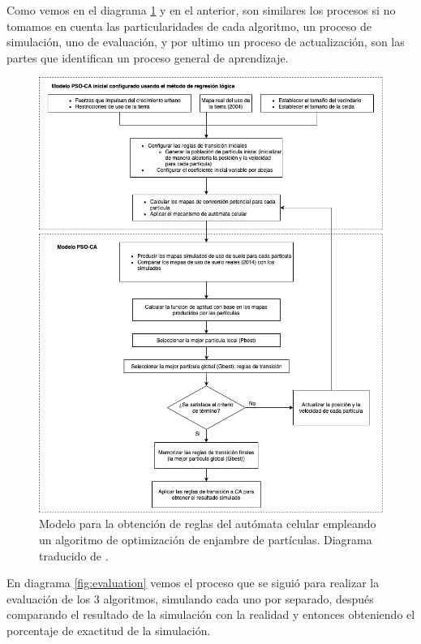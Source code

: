 Como vemos en el diagrama \ref{fig:pso} y en el anterior, son similares los procesos si no tomamos en cuenta las particularidades de cada algoritmo, un proceso de simulación, uno de evaluación, y por ultimo un proceso de actualización, son las partes que identifican un proceso general de aprendizaje.

\begin{figure}[H]
	\centering
	\includegraphics[width=\linewidth]{fig/particulas}
	\caption{Modelo para la obtención de reglas del autómata celular empleando un algoritmo de optimización de enjambre de partículas. Diagrama traducido de \cite{naghibi2016discovery}.}
	\label{fig:pso}
\end{figure}

En diagrama \ref{fig:evaluation} vemos el proceso que se siguió para realizar la evaluación de los 3 algoritmos, simulando cada uno por separado, después comparando el resultado de la simulación con la realidad y entonces obteniendo el porcentaje de exactitud de la simulación.

